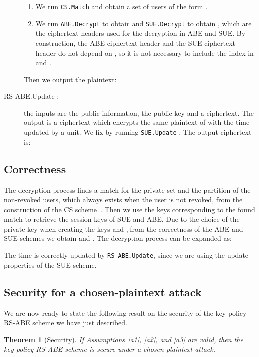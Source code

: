 \documentclass[a4paper,10pt]{article}
\newtheorem{theorem}{Theorem}
\newcommand{\mapssingleoutput}[2]{}
\newcommand{\algorithm}[2]{\texttt{#1.#2}}
\newcommand{\algorithmdefsingleoutput}[4]{\item[#1.#2 \mapssingleoutput{#3}{#4}:] }
\begin{document}
\begin{description}
	\begin{enumerate}
		\item
		We run \algorithm{CS}{Match} and obtain a set of users of the form .
		\item
		We run \algorithm{ABE}{Decrypt} to obtain  and  \algorithm{SUE}{Decrypt} to obtain , which are the ciphertext headers used for the decryption in ABE and SUE. By construction,  the ABE ciphertext header and the SUE ciphertext header do not depend on , so it is not necessary to include the index  in  and .
	\end{enumerate}
	Then we output the plaintext:
	
	
	\algorithmdefsingleoutput{RS-ABE}{Update}{\mathit{\mathrm{PI}},\mathit{\mathrm{PK}},\mathrm{CT}_{S,T}}{\mathrm{CT}_{S,T+1}} the inputs are the public information, the public key and a ciphertext.
	The output is a ciphertext  which encrypts the same plaintext of  with the time updated by a unit.
	We fix  by running \linebreak \algorithm{SUE}{Update}
	.
	The output ciphertext is:
	
	
\end{description}
	
	\subsection{Correctness}\label{subsec:cor}
	The decryption process finds a match for the private set and the partition of the non-revoked users, which always exists when the user is not revoked, from the construction of the CS scheme~\cite{naor2001SC}. Then we use the keys corresponding to the found match to retrieve the session keys of SUE and ABE. Due to the choice of the private key when creating the keys  and , from the correctness of the ABE and SUE schemes we obtain  and .
	The decryption process can be expanded as:
	
	The time is correctly updated by \algorithm{RS-ABE}{Update}, since we are using the update properties of the SUE scheme.


	\subsection{Security for a chosen-plaintext attack}
	\label{security_section}
	We are now ready to state the following result on the security of the key-policy RS-ABE scheme we have just described.
	
	\begin{theorem}[Security]
	\label{RS-ABE_security_th}
	If Assumptions~\ref{a1}, \ref{a2}, and \ref{a3} are valid, then the key-policy RS-ABE scheme is secure under a chosen-plaintext attack.
	\begin{comment}
	Moreover, the advantage of the RS-ABE scheme is restrained by the inequality
	
	where  is a PPT adversary who queries at most  between private and update keys,  is the maximum number of users,  is the maximum size of a set of revoked users
	\end{comment}
	\end{theorem}
	
\end{document}
